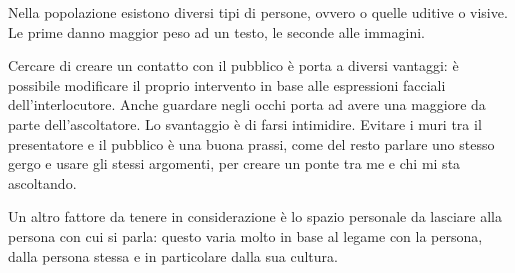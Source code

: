 Nella popolazione esistono diversi tipi di persone, ovvero o quelle uditive o
visive. Le prime danno maggior peso ad un testo, le seconde alle immagini.

Cercare di creare un contatto con il pubblico è porta a diversi vantaggi: è
possibile modificare il proprio intervento in base alle espressioni facciali
dell'interlocutore. Anche guardare negli occhi porta ad avere una maggiore da
parte dell'ascoltatore. Lo svantaggio è di farsi intimidire. Evitare i muri tra
il presentatore e il pubblico è una buona prassi, come del resto parlare uno
stesso gergo e usare gli stessi argomenti, per creare un ponte tra me e chi mi
sta ascoltando.

Un altro fattore da tenere in considerazione è lo spazio personale da lasciare
alla persona con cui si parla: questo varia molto in base al legame con la
persona, dalla persona stessa e in particolare dalla sua cultura.
